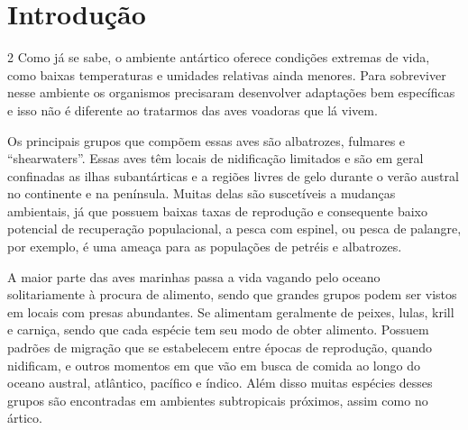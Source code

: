 \chapter{Introdução}
\label{Intro}
\begin {multicols}{2}
\textcolor {laranja} {Como já se sabe, o ambiente antártico oferece condições extremas de vida, como baixas temperaturas e umidades relativas ainda menores. Para sobreviver nesse ambiente os organismos precisaram desenvolver adaptações bem específicas e isso não é diferente ao tratarmos das aves voadoras que lá vivem.}

Os principais grupos que compõem essas aves são albatrozes, fulmares e “shearwaters”. Essas aves têm locais de nidificação limitados e são em geral confinadas as ilhas subantárticas e a regiões livres de gelo durante o verão austral no continente e na península. Muitas delas são suscetíveis a mudanças ambientais, já que possuem baixas taxas de reprodução e consequente baixo potencial de recuperação populacional, a pesca com espinel, ou pesca de palangre, por exemplo, é uma ameaça para as populações de petréis e albatrozes.

\hrulefill

A maior parte das aves marinhas passa a vida vagando pelo oceano solitariamente à procura de alimento, sendo que grandes grupos podem ser vistos em locais com presas abundantes. Se alimentam geralmente de peixes, lulas, krill e carniça, sendo que cada espécie tem seu modo de obter alimento. Possuem padrões de migração que se estabelecem entre épocas de reprodução, quando nidificam, e outros momentos em que vão em busca de comida ao longo do oceano austral, atlântico, pacífico e índico. Além disso muitas espécies desses grupos são encontradas em ambientes subtropicais próximos, assim como no ártico.
\end {multicols}